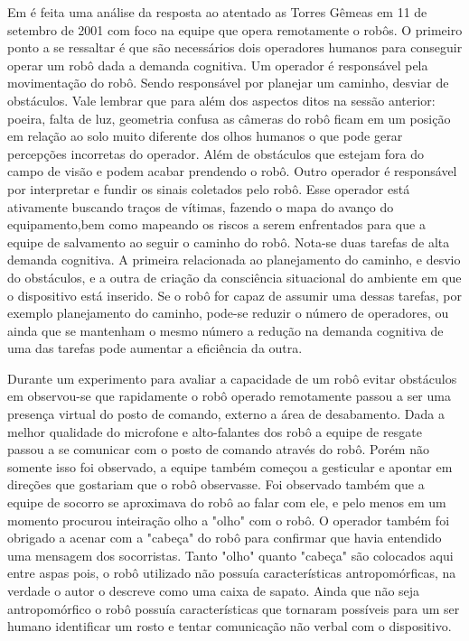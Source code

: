 \documentclass[
	article,			%
	11pt,				%
	oneside,			%
	a4paper,			%
	english,			%
	brazil,				%
	sumario=tradicional	
	]{abntex2}
\begin{document}
Em \cite{Robin2004} é feita uma análise da resposta ao atentado as Torres Gêmeas em 11 de setembro de 2001 com foco na equipe que opera remotamente o robôs. O primeiro ponto a se ressaltar é que são necessários dois operadores humanos para conseguir operar um robô dada a demanda cognitiva. Um operador é responsável pela movimentação do robô. Sendo responsável por planejar um caminho, desviar de obstáculos. Vale lembrar que para além dos aspectos ditos na sessão anterior: poeira, falta de luz, geometria confusa as câmeras do robô ficam em um posição em relação ao solo muito diferente dos olhos humanos o que pode gerar percepções incorretas do operador. Além de obstáculos que estejam fora do campo de visão e podem acabar prendendo o robô.  Outro operador é responsável por interpretar e fundir os sinais coletados pelo robô. Esse operador está ativamente buscando traços de vítimas, fazendo o mapa do avanço do equipamento,bem como mapeando os riscos a serem enfrentados para que a equipe de salvamento ao seguir o caminho do robô. Nota-se duas tarefas de alta demanda cognitiva. A primeira relacionada ao planejamento do caminho, e desvio do obstáculos, e a outra de criação da consciência situacional do ambiente em que o dispositivo está inserido. Se o robô for capaz de assumir uma dessas tarefas, por exemplo planejamento do caminho, pode-se reduzir o número de operadores, ou ainda que se mantenham o mesmo número a redução na demanda cognitiva de uma das tarefas pode aumentar a eficiência da outra.

Durante um experimento para avaliar a capacidade de um robô evitar obstáculos em \cite{fin2004} observou-se que rapidamente o robô operado remotamente passou a ser uma presença virtual do posto de comando, externo a área de desabamento. Dada a melhor qualidade do microfone e alto-falantes dos robô a equipe de resgate passou a se comunicar com o posto de comando através do robô. Porém não somente isso foi observado, a equipe também começou a gesticular e apontar em direções que gostariam que o robô observasse. Foi observado também que a equipe de socorro se aproximava do robô ao falar com ele, e pelo menos em um momento procurou inteiração olho a "olho" com o robô. O operador também foi obrigado a acenar com a "cabeça" do robô para confirmar que havia entendido uma mensagem dos socorristas. Tanto "olho" quanto "cabeça" são colocados aqui entre aspas pois, o robô utilizado não possuía características antropomórficas, na verdade o autor o descreve como uma caixa de sapato. Ainda que não seja antropomórfico o robô possuía características que tornaram possíveis para um ser humano identificar um rosto e tentar comunicação não verbal com o dispositivo.
\end{document}

